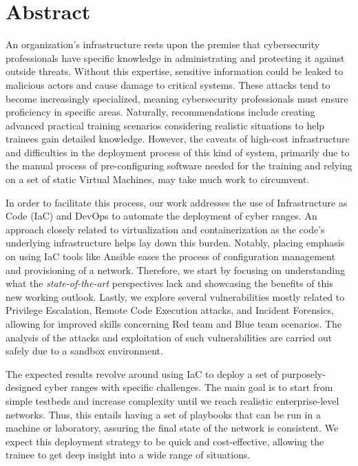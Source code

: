 \chapter*{Abstract}

An organization's infrastructure rests upon the premise that cybersecurity professionals have specific knowledge in administrating and protecting it against outside threats. Without this expertise, sensitive information could be leaked to malicious actors and cause damage to critical systems. These attacks tend to become increasingly specialized, meaning cybersecurity professionals must ensure proficiency in specific areas. Naturally, recommendations include creating advanced practical training scenarios considering realistic situations to help trainees gain detailed knowledge. However, the caveats of high-cost infrastructure and difficulties in the deployment process of this kind of system, primarily due to the manual process of pre-configuring software needed for the training and relying on a set of static Virtual Machines, may take much work to circumvent.

In order to facilitate this process, our work addresses the use of Infrastructure as Code (IaC) and DevOps to automate the deployment of cyber ranges. An approach closely related to virtualization and containerization as the code's underlying infrastructure helps lay down this burden. Notably, placing emphasis on using IaC tools like Ansible eases the process of configuration management and provisioning of a network. Therefore, we start by focusing on understanding what the \textit{state-of-the-art} perspectives lack and showcasing the benefits of this new working outlook. Lastly, we explore several vulnerabilities mostly related to Privilege Escalation, Remote Code Execution attacks, and Incident Forensics, allowing for improved skills concerning Red team and Blue team scenarios. The analysis of the attacks and exploitation of such vulnerabilities are carried out safely due to a sandbox environment.

The expected results revolve around using IaC to deploy a set of purposely-designed cyber ranges with specific challenges. The main goal is to start from simple testbeds and increase complexity until we reach realistic enterprise-level networks. Thus, this entails having a set of playbooks that can be run in a machine or laboratory, assuring the final state of the network is consistent. We expect this deployment strategy to be quick and cost-effective, allowing the trainee to get deep insight into a wide range of situations.

